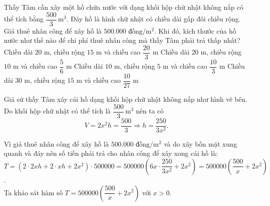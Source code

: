 \begin{ex}%
 Thầy Tâm cần xây một hồ chứa nước với dạng khối hộp chữ nhật không nắp có thể tích bằng $\dfrac{500}{3} \mathrm{\, m}^3$. Đáy hồ là hình chữ nhật có chiều dài gấp đôi chiều rộng. Giá thuê nhân công để xây hồ là $500.000 \textrm{ đồng}/\textrm{m}^2$. Khi đó, kích thước của hồ nước như thế nào để chi phí thuê nhân công mà thầy Tâm phải trả thấp nhất?
 \choice
  {Chiều dài $20$ m, chiều rộng $15$ m và chiều cao $\dfrac{20}{3}$ m}
  {Chiều dài $20$ m, chiều rộng $10$ m và chiều cao $\dfrac{5}{6}$ m}
  {\True Chiều dài $10$ m, chiều rộng $5$ m và chiều cao $\dfrac{10}{3}$ m}
  {Chiều dài $30$ m, chiều rộng $15$ m và chiều cao $\dfrac{10}{27}$ m}
 \loigiai
  {
  \immini
   {
   Giả sử thầy Tâm xây cái hồ dạng khối hộp chữ nhật không nắp như hình vẽ bên. Do khối hộp chữ nhật có thể tích là $\dfrac{500}{3} \mathrm{\, m}^3$ nên ta có
   $$V = 2x^2 h = \dfrac{500}{3} \Rightarrow h = \dfrac{250}{3x^2}.$$
   }
   {
   }
Vì giá thuê nhân công để xây hồ là $500.000 \textrm{ đồng}/\textrm{m}^2$ và do xây bốn mặt xung quanh và đáy nên số tiền phải trả cho nhân công để xây xong cái hồ là:\\
$
    T= (2 \cdot 2xh + 2 \cdot xh + 2x^2) \cdot 500000=500000 \left( 6x \cdot \dfrac{250}{3x^2} + 2x^2 \right)=500000 \left( \dfrac{500}{x} + 2x^2 \right)$.\\
   Ta khảo sát hàm số $T = 500000 \left( \dfrac{500}{x} + 2x^2 \right)$ với $x > 0$.\\
}
\end{ex}
